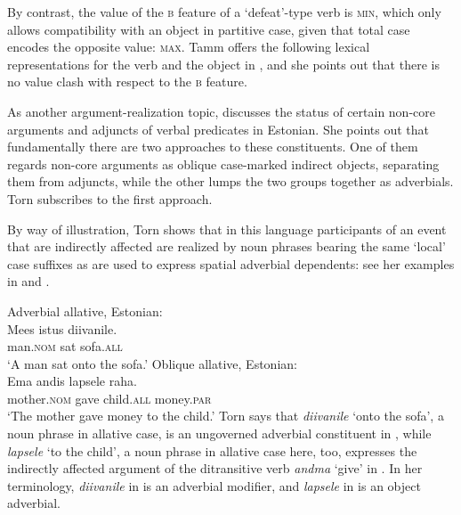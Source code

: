\documentclass[output=paper,hidelinks]{langscibook}
\begin{document}
By contrast, the value of the \textsc{b} feature of a `defeat'-type verb is \textsc{min}, which only allows compatibility with an object in partitive case, given that total case encodes the opposite value: \textsc{max}. Tamm offers the following lexical representations for the verb and the object in , and she points out that there is no value clash with respect to the \textsc{b} feature.


\ea%
    \label{ex:FinnoUgric:37}
\z

\ea%
    \label{ex:FinnoUgric:38}
\z


As another argument-realization topic, \citet{Torn2006} discusses the status of certain non-core arguments and adjuncts of verbal predicates in Estonian. She points out that fundamentally there are two approaches to these constituents. One of them regards non-core arguments as oblique case-marked indirect objects, separating them from adjuncts, while the other lumps the two groups together as adverbials. Torn subscribes to the first approach. 



By way of illustration, Torn shows that in this language participants of an event that are indirectly affected are realized by noun phrases bearing the same `local' case suffixes as are used to express spatial adverbial dependents: see her examples in  and .


\ea%
    \label{ex:FinnoUgric:39}Adverbial allative, Estonian:\\
    \gll Mees istus diivanile.\\
        man.\textsc{nom} sat sofa.\textsc{all}\\
    \glt`A man sat onto the sofa.'
    \z
\ea%
    \label{ex:FinnoUgric:40}Oblique allative, Estonian:\\
    \gll Ema andis lapsele raha.\\
        mother.\textsc{nom} gave child.\textsc{all} money.\textsc{par}\\
    \glt `The mother gave money to the child.'
    \z
Torn says that \textit{diivanile} `onto the sofa', a noun phrase in allative case, is an ungoverned adverbial constituent in , while \textit{lapsele} `to the child', a noun phrase in allative case here, too, expresses the indirectly affected argument of the ditransitive verb \textit{andma} `give' in . In her terminology, \textit{diivanile} in  is an adverbial modifier, and \textit{lapsele} in  is an object adverbial.
\end{document}

